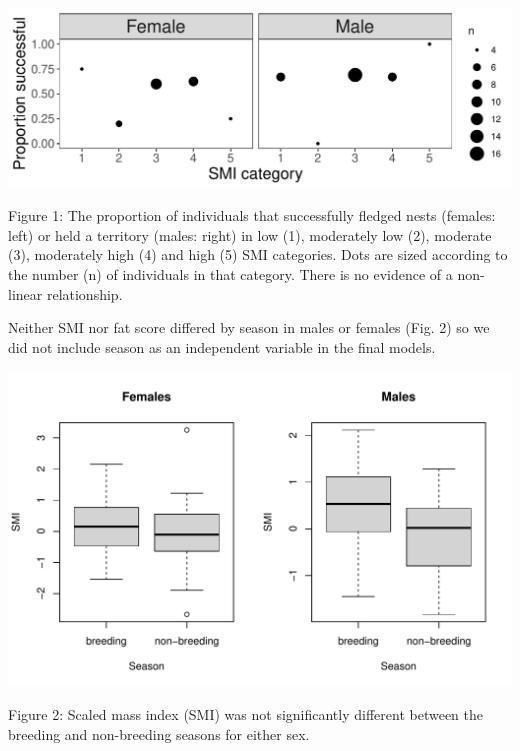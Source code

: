 \documentclass[
]{article}
\begin{document}
\includegraphics{gcondition_files/figure-latex/p2 non-linear trend results-1.pdf}

Figure 1: The proportion of individuals that successfully fledged nests
(females: left) or held a territory (males: right) in low (1),
moderately low (2), moderate (3), moderately high (4) and high (5) SMI
categories. Dots are sized according to the number (n) of individuals in
that category. There is no evidence of a non-linear relationship.

Neither SMI nor fat score differed by season in males or females (Fig.
2) so we did not include season as an independent variable in the final
models.

\includegraphics{gcondition_files/figure-latex/p2 condition and season-1.pdf}

Figure 2: Scaled mass index (SMI) was not significantly different
between the breeding and non-breeding seasons for either sex.
\end{document}
